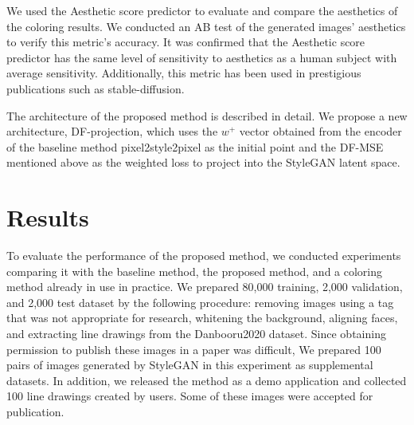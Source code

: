 \documentclass[a4paper]{article}
\newcommand{\aftersection}{\vspace{-5pt}}
\newcommand{\beforesection}{\vspace{-10pt}}
\begin{document}
\begin{multicols}{2}
We used the Aesthetic score predictor to evaluate and compare the aesthetics of the coloring results. We conducted an AB test of the generated images' aesthetics to verify this metric's accuracy. It was confirmed that the Aesthetic score predictor has the same level of sensitivity to aesthetics as a human subject with average sensitivity. Additionally, this metric has been used in prestigious publications such as stable-diffusion.

The architecture of the proposed method is described in detail. We propose a new architecture, DF-projection, which uses the $w^+$ vector obtained from the encoder of the baseline method pixel2style2pixel as the initial point and the DF-MSE mentioned above as the weighted loss to project into the StyleGAN latent space.




\beforesection
\section*{Results}
\aftersection

To evaluate the performance of the proposed method, we conducted experiments comparing it with the baseline method, the proposed method, and a coloring method already in use in practice. We prepared 80,000 training, 2,000 validation, and 2,000 test dataset by the following procedure: removing images using a tag that was not appropriate for research, whitening the background, aligning faces, and extracting line drawings from the Danbooru2020 dataset. Since obtaining permission to publish these images in a paper was difficult, We prepared 100 pairs of images generated by StyleGAN in this experiment as supplemental datasets. In addition, we released the method as a demo application and collected 100 line drawings created by users. Some of these images were accepted for publication.


\end{multicols}
\end{document}
